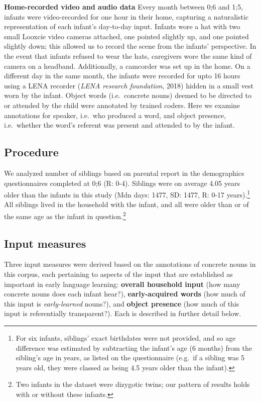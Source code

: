 \documentclass[
  english,
  man,floatsintext]{apa6}
\begin{document}
\textbf{Home-recorded video and audio data} Every month between 0;6 and 1;5, infants were video-recorded for one hour in their home, capturing a naturalistic representation of each infant's day-to-day input. Infants wore a hat with two small Looxcie video cameras attached, one pointed slightly up, and one pointed slightly down; this allowed us to record the scene from the infants' perspective. In the event that infants refused to wear the hats, caregivers wore the same kind of camera on a headband. Additionally, a camcorder was set up in the home. On a different day in the same month, the infants were recorded for upto 16 hours using a LENA recorder (\emph{LENA research foundation}, 2018) hidden in a small vest worn by the infant. Object words (i.e.~concrete nouns) deemed to be directed to or attended by the child were annotated by trained coders. Here we examine annotations for speaker, i.e.~who produced a word, and object presence, i.e.~whether the word's referent was present and attended to by the infant.

\hypertarget{procedure}{%
\subsection{Procedure}\label{procedure}}

We analyzed number of siblings based on parental report in the demographics questionnaires completed at 0;6 (R: 0-4). Siblings were on average 4.05 years older than the infants in this study (Mdn days: 1477, SD: 1477, R: 0-17 years).\footnote{For six infants, siblings' exact birthdates were not provided, and so age difference was estimated by subtracting the infant's age (6 months) from the sibling's age in years, as listed on the questionnaire (e.g.~if a sibling was 5 years old, they were classed as being 4.5 years older than the infant).} All siblings lived in the household with the infant, and all were older than or of the same age as the infant in question.\footnote{Two infants in the dataset were dizygotic twins; our pattern of results holds with or without these infants.}

\hypertarget{input-measures}{%
\subsection{Input measures}\label{input-measures}}

Three input measures were derived based on the annotations of concrete nouns in this corpus, each pertaining to aspects of the input that are established as important in early language learning: \textbf{overall household input} (how many concrete nouns does each infant hear?), \textbf{early-acquired words} (how much of this input is \emph{early-learned} nouns?), and \textbf{object presence} (how much of this input is referentially transparent?). Each is described in further detail below.
\end{document}
